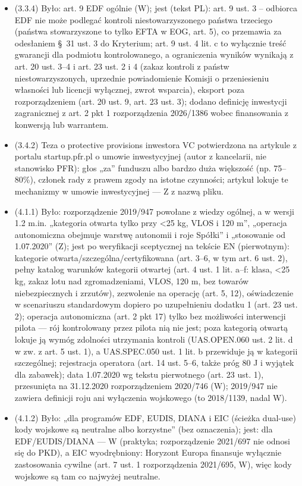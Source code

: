 \documentclass[12pt,a4paper]{report}
\begin{document}
\begin{itemize}
  \item (3.3.4) Było: art. 9 EDF ogólnie (W); jest (tekst PL): art. 9 ust. 3 – odbiorca EDF nie może podlegać kontroli niestowarzyszonego państwa trzeciego (państwa stowarzyszone to tylko EFTA w EOG, art. 5), co przemawia za odesłaniem §~31 ust. 3 do Kryterium; art. 9 ust. 4 lit. c to wyłącznie treść gwarancji dla podmiotu kontrolowanego, a ograniczenia wyników wynikają z art. 20 ust. 3–4 i art. 23 ust. 2 i 4 (zakaz kontroli z państw niestowarzyszonych, uprzednie powiadomienie Komisji o przeniesieniu własności lub licencji wyłącznej, zwrot wsparcia), eksport poza rozporządzeniem (art. 20 ust. 9, art. 23 ust. 3); dodano definicję inwestycji zagranicznej z art. 2 pkt 1 rozporządzenia 2026/1386 wobec finansowania z konwersją lub warrantem.
  \item (3.4.2) Teza o protective provisions inwestora VC potwierdzona na artykule z portalu startup.pfr.pl o umowie inwestycyjnej (autor z kancelarii, nie stanowisko PFR): głos „za” funduszu albo bardzo duża większość (np. 75–80\%), członek rady z prawem zgody na istotne czynności; artykuł lokuje te mechanizmy w umowie inwestycyjnej — Z z nazwą pliku.
  \item (4.1.1) Było: rozporządzenie 2019/947 powołane z wiedzy ogólnej, a w wersji 1.2 m.in. „kategoria otwarta tylko przy <25 kg, VLOS i 120 m”, „operacja autonomiczna obejmuje warstwę autonomii i roje Spółki” i „stosowanie od 1.07.2020” (Z); jest po weryfikacji sceptycznej na tekście EN (pierwotnym): kategorie otwarta/szczególna/certyfikowana (art. 3--6, w tym art. 6 ust. 2), pełny katalog warunków kategorii otwartej (art. 4 ust. 1 lit. a--f: klasa, <25 kg, zakaz lotu nad zgromadzeniami, VLOS, 120 m, bez towarów niebezpiecznych i zrzutów), zezwolenie na operację (art. 5, 12), oświadczenie w scenariuszu standardowym dopiero po uzupełnieniu dodatku 1 (art. 23 ust. 2); operacja autonomiczna (art. 2 pkt 17) tylko bez możliwości interwencji pilota --- rój kontrolowany przez pilota nią nie jest; poza kategorią otwartą lokuje ją wymóg zdolności utrzymania kontroli (UAS.OPEN.060 ust. 2 lit. d w zw. z art. 5 ust. 1), a UAS.SPEC.050 ust. 1 lit. b przewiduje ją w kategorii szczególnej; rejestracja operatora (art. 14 ust. 5--6, także próg 80 J i wyjątek dla zabawek); data 1.07.2020 wg tekstu pierwotnego (art. 23 ust. 1), przesunięta na 31.12.2020 rozporządzeniem 2020/746 (W); 2019/947 nie zawiera definicji roju ani wyłączenia wojskowego (to 2018/1139, nadal W).
  \item (4.1.2) Było: „dla programów EDF, EUDIS, DIANA i EIC (ścieżka dual-use) kody wojskowe są neutralne albo korzystne” (bez oznaczenia); jest: dla EDF/EUDIS/DIANA --- W (praktyka; rozporządzenie 2021/697 nie odnosi się do PKD), a EIC wyodrębniony: Horyzont Europa finansuje wyłącznie zastosowania cywilne (art. 7 ust. 1 rozporządzenia 2021/695, W), więc kody wojskowe są tam co najwyżej neutralne.

\end{itemize}
\end{document}
